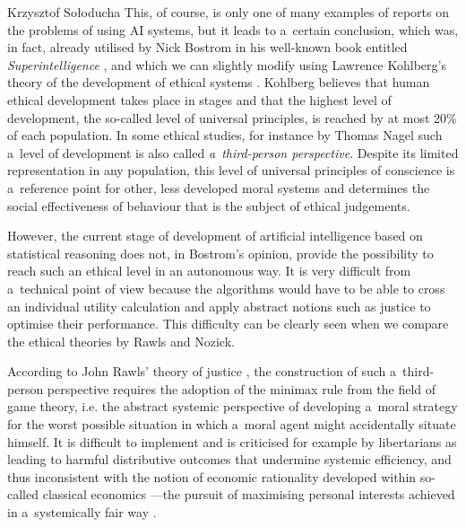 \begin{artengenv}{Krzysztof Sołoducha}
This, of course, is only one of many examples of reports on the problems of using AI systems, but it leads to a~certain conclusion, which was, in fact, already utilised by Nick Bostrom in his well-known book entitled \textit{Superintelligence}
\parencite[][p.306]{bostrom_superintelligence_2016}, %
 and which we can slightly modify using Lawrence Kohlberg's theory of the development of ethical systems 
\parencites[][]{kohlberg_development_1958}[see also][]{gornicka_rozwoj_1980}[][]{czyzowska_formy_1993}. %
 Kohlberg believes that human ethical development takes place in stages and that the highest level of development, the so-called level of universal principles, is reached by at most 20\% of each population. In some ethical studies, for instance by Thomas Nagel 
\parencite*[][p.208]{nagel_view_1986} %
 such a~level of development is also called \textit{a~third-person perspective}. Despite its limited representation in any population, this level of universal principles of conscience is a~reference point for other, less developed moral systems and determines the social effectiveness of behaviour that is the subject of ethical judgements.

However, the current stage of development of artificial intelligence based on statistical reasoning does not, in Bostrom's opinion, provide the possibility to reach such an ethical level in an autonomous way. It is very difficult from a~technical point of view because the algorithms would have to be able to cross an individual utility calculation and apply abstract notions such as justice to optimise their performance. This difficulty can be clearly seen when we compare the ethical theories by Rawls and Nozick.

According to John Rawls' theory of justice
\parencite[][]{rawls_theory_1971}, %
 the construction of such a~third-person perspective requires the adoption of the minimax rule from the field of game theory, i.e. the abstract systemic perspective of developing a~moral strategy for the worst possible situation in which a~moral agent might accidentally situate himself. It is difficult to implement 
\parencites[][]{arrow_ordinalist-utilitarian_1973}[][]{harsanyi_can_1975} %
 and is criticised for example by libertarians as leading to harmful distributive outcomes that undermine systemic efficiency, and thus inconsistent with the notion of economic rationality developed within so-called classical economics 
\parencite[][]{wysocki_problem_2021}%
—the pursuit of maximising personal interests achieved in a~systemically fair way 
\parencite[][]{nozick_anarchy_2013}.%



\end{artengenv}
